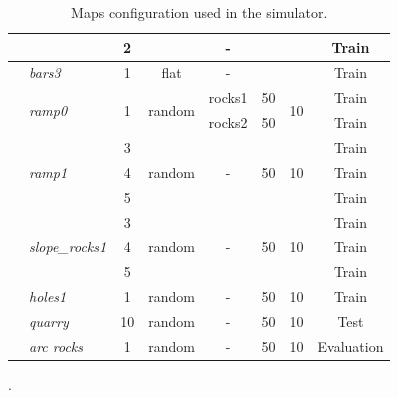 \documentclass[../document.tex]{subfiles}
\begin{document}
\begin{table} [htbp]
\begin{tabular}[]{@{}llcccccc@{}}
      && 2 &  & - &  &  & Train \\
      \hline
      &\emph{bars3} & 1 & flat  & - &  &  & Train \\
      \hline
      &\multirow{2}{*}{\emph{ramp0}} & \multirow{2}{*}{1} & \multirow{2}{*}{random} & rocks1 & 50 & \multirow{2}{*}{10} & Train \\
      &&&& rocks2 & 50 &  & Train \\
      \hline
      &\multirow{3}{*}{\emph{ramp1}} & 3 & \multirow{3}{*}{random} & \multirow{3}{*}{-} & \multirow{3}{*}{50} & \multirow{3}{*}{10} & Train \\
      && 4 &&&& & Train \\
      && 5 &&&& & Train \\
      \hline 
      &\multirow{3}{*}{\emph{slope\_rocks1}} & 3 & \multirow{3}{*}{random} & \multirow{3}{*}{-} & \multirow{3}{*}{50} & \multirow{3}{*}{10} & Train \\
      && 4 &&&& & Train \\
      && 5 &&&& & Train \\
      \hline
      &\emph{holes1} & 1 &random & - & 50 & 10 & Train \\
      \hline
      &\emph{quarry} & 10 &random & - & 50 & 10 & Test \\
      \hline
      &\emph{arc rocks} & 1 &random & - & 50 & 10 & Evaluation \\
      \hline 
    \end{tabular}. 
    \caption{Maps configuration used in the simulator.}
    \label{tab: maps}
  \end{table}
\end{document}

